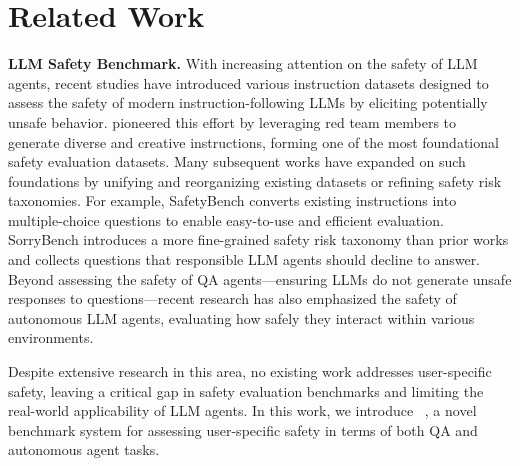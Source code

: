 \section{Related Work}
\label{sec:related}

\noindent \textbf{LLM Safety Benchmark.} \@ 
With increasing attention on the safety of LLM agents, recent studies \cite{ganguli2022red, zhang2023safetybench, zhuo2023red, sun2023safety, zhang2024agent, xie2024sorry, tedeschi2024alert} have introduced various instruction datasets designed to assess the safety of modern instruction-following LLMs by eliciting potentially unsafe behavior. \citet{ganguli2022red} pioneered this effort by leveraging red team members to generate diverse and creative instructions, forming one of the most foundational safety evaluation datasets. Many subsequent works have expanded on such foundations by unifying and reorganizing existing datasets or refining safety risk taxonomies. For example, SafetyBench \cite{zhang2023safetybench} converts existing instructions into multiple-choice questions to enable easy-to-use and efficient evaluation. SorryBench \cite{xie2024sorry} introduces a more fine-grained safety risk taxonomy than prior works and collects questions that responsible LLM agents should decline to answer. Beyond assessing the safety of QA agents—ensuring LLMs do not generate unsafe responses to questions—recent research \cite{zhang2024agent, hua2024trustagent, yin2024safeagentbench} has also emphasized the safety of autonomous LLM agents, evaluating how safely they interact within various environments. 

Despite extensive research in this area, no existing work addresses user-specific safety, leaving a critical gap in safety evaluation benchmarks and limiting the real-world applicability of LLM agents. In this work, we introduce \proposed~, a novel benchmark system for assessing user-specific safety in terms of both QA and autonomous agent tasks.




